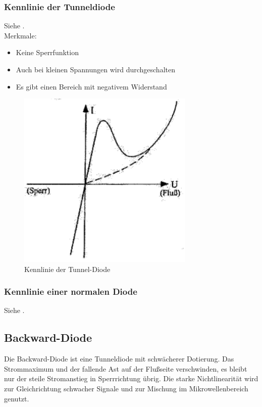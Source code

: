     \subsubsection{Kennlinie der Tunneldiode}
    Siehe .\\
    Merkmale:
    \begin{itemize}
        \item Keine Sperrfunktion
        \item Auch bei kleinen Spannungen wird durchgeschalten
        \item Es gibt einen Bereich mit negativem Widerstand
    \end{itemize}
    \begin{figure}[h]
        \centering
        \includegraphics[width=0.75\textwidth]{fig/tunneldiode}
        \caption{Kennlinie der Tunnel-Diode}
        \label{fig:tunneldiodeKennlinie}
    \end{figure}
    
    \subsubsection{Kennlinie einer normalen Diode}
    Siehe .

\subsection{Backward-Diode }\label{k5:backward}
Die Backward-Diode ist eine Tunneldiode mit schw\"acherer Dotierung. Das Strommaximum und der fallende Ast
auf der Flu{\ss}seite verschwinden, es bleibt nur der steile Stromanstieg in Sperrrichtung \"ubrig.
Die starke Nichtlinearit\"at wird zur Gleichrichtung schwacher Signale und zur Mischung im Mikrowellenbereich
genutzt.

